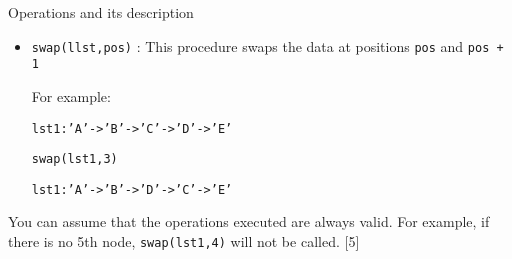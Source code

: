 Operations and its description 
\begin{itemize}
\item \texttt{swap(llst,pos)} : This procedure swaps the data at positions
\texttt{pos} and \texttt{pos + 1}

For example: 

\noindent %
\noindent\begin{minipage}[t]{1\columnwidth}%
\texttt{lst1:'A'->'B'->'C'->'D'->'E' }

\texttt{swap(lst1,3)}

\texttt{lst1:'A'->'B'->'D'->'C'->'E'}%
\end{minipage}
\end{itemize}
You can assume that the operations executed are always valid. For
example, if there is no 5th node, \texttt{swap(lst1,4)} will not be
called. \hfill{}{[}5{]}